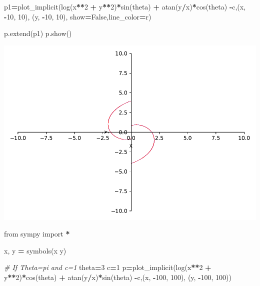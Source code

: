 \documentclass[
]{book}
\newenvironment{Shaded}{\begin{snugshade}}{\end{snugshade}}
\newcommand{\CommentTok}[1]{\textcolor[rgb]{0.56,0.35,0.01}{\textit{#1}}}
\newcommand{\DecValTok}[1]{\textcolor[rgb]{0.00,0.00,0.81}{#1}}
\newcommand{\ImportTok}[1]{#1}
\newcommand{\NormalTok}[1]{#1}
\newcommand{\OperatorTok}[1]{\textcolor[rgb]{0.81,0.36,0.00}{\textbf{#1}}}
\newcommand{\StringTok}[1]{\textcolor[rgb]{0.31,0.60,0.02}{#1}}
\newcommand{\VariableTok}[1]{\textcolor[rgb]{0.00,0.00,0.00}{#1}}
\theoremstyle{definition}
\theoremstyle{definition}
\theoremstyle{definition}
\theoremstyle{definition}
\theoremstyle{remark}
\begin{document}
\begin{Shaded}
\begin{Highlighting}[]
\NormalTok{p1}\OperatorTok{=}\NormalTok{plot\_implicit(log(x}\OperatorTok{**}\DecValTok{2} \OperatorTok{+}\NormalTok{ y}\OperatorTok{**}\DecValTok{2}\NormalTok{)}\OperatorTok{*}\NormalTok{sin(theta) }\OperatorTok{+}\NormalTok{ atan(y}\OperatorTok{/}\NormalTok{x)}\OperatorTok{*}\NormalTok{cos(theta) }\OperatorTok{{-}}\NormalTok{c,(x, }\OperatorTok{{-}}\DecValTok{10}\NormalTok{, }\DecValTok{10}\NormalTok{), (y, }\OperatorTok{{-}}\DecValTok{10}\NormalTok{, }\DecValTok{10}\NormalTok{), show}\OperatorTok{=}\VariableTok{False}\NormalTok{,line\_color}\OperatorTok{=}\StringTok{\textquotesingle{}r\textquotesingle{}}\NormalTok{)}

\NormalTok{p.extend(p1)}
\NormalTok{p.show()}
\end{Highlighting}
\end{Shaded}

\includegraphics{ConformalMapping_files/figure-latex/unnamed-chunk-61-8.pdf}

\begin{Shaded}
\begin{Highlighting}[]
\ImportTok{from}\NormalTok{ sympy }\ImportTok{import} \OperatorTok{*}

\NormalTok{x, y }\OperatorTok{=}\NormalTok{ symbols(}\StringTok{\textquotesingle{}x y\textquotesingle{}}\NormalTok{)}

\CommentTok{\# If Theta=pi and c=1}
\NormalTok{theta}\OperatorTok{=}\DecValTok{3}
\NormalTok{c}\OperatorTok{=}\DecValTok{1}
\NormalTok{p}\OperatorTok{=}\NormalTok{plot\_implicit(log(x}\OperatorTok{**}\DecValTok{2} \OperatorTok{+}\NormalTok{ y}\OperatorTok{**}\DecValTok{2}\NormalTok{)}\OperatorTok{*}\NormalTok{cos(theta) }\OperatorTok{+}\NormalTok{ atan(y}\OperatorTok{/}\NormalTok{x)}\OperatorTok{*}\NormalTok{sin(theta) }\OperatorTok{{-}}\NormalTok{c,(x, }\OperatorTok{{-}}\DecValTok{100}\NormalTok{, }\DecValTok{100}\NormalTok{), (y, }\OperatorTok{{-}}\DecValTok{100}\NormalTok{, }\DecValTok{100}\NormalTok{))}
\end{Highlighting}
\end{Shaded}
\end{document}
